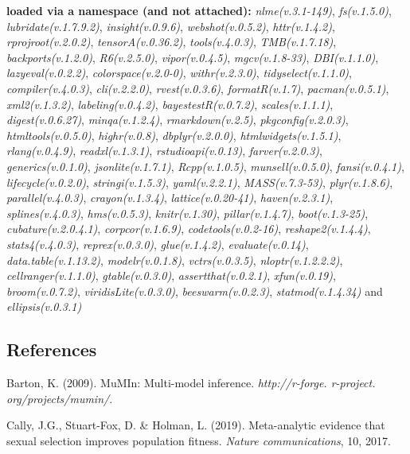 \documentclass[
]{article}
\begin{document}
\textbf{loaded via a namespace (and not attached):}
\emph{nlme(v.3.1-149)}, \emph{fs(v.1.5.0)}, \emph{lubridate(v.1.7.9.2)},
\emph{insight(v.0.9.6)}, \emph{webshot(v.0.5.2)}, \emph{httr(v.1.4.2)},
\emph{rprojroot(v.2.0.2)}, \emph{tensorA(v.0.36.2)},
\emph{tools(v.4.0.3)}, \emph{TMB(v.1.7.18)}, \emph{backports(v.1.2.0)},
\emph{R6(v.2.5.0)}, \emph{vipor(v.0.4.5)}, \emph{mgcv(v.1.8-33)},
\emph{DBI(v.1.1.0)}, \emph{lazyeval(v.0.2.2)},
\emph{colorspace(v.2.0-0)}, \emph{withr(v.2.3.0)},
\emph{tidyselect(v.1.1.0)}, \emph{compiler(v.4.0.3)},
\emph{cli(v.2.2.0)}, \emph{rvest(v.0.3.6)}, \emph{formatR(v.1.7)},
\emph{pacman(v.0.5.1)}, \emph{xml2(v.1.3.2)}, \emph{labeling(v.0.4.2)},
\emph{bayestestR(v.0.7.2)}, \emph{scales(v.1.1.1)},
\emph{digest(v.0.6.27)}, \emph{minqa(v.1.2.4)}, \emph{rmarkdown(v.2.5)},
\emph{pkgconfig(v.2.0.3)}, \emph{htmltools(v.0.5.0)},
\emph{highr(v.0.8)}, \emph{dbplyr(v.2.0.0)},
\emph{htmlwidgets(v.1.5.1)}, \emph{rlang(v.0.4.9)},
\emph{readxl(v.1.3.1)}, \emph{rstudioapi(v.0.13)},
\emph{farver(v.2.0.3)}, \emph{generics(v.0.1.0)},
\emph{jsonlite(v.1.7.1)}, \emph{Rcpp(v.1.0.5)}, \emph{munsell(v.0.5.0)},
\emph{fansi(v.0.4.1)}, \emph{lifecycle(v.0.2.0)},
\emph{stringi(v.1.5.3)}, \emph{yaml(v.2.2.1)}, \emph{MASS(v.7.3-53)},
\emph{plyr(v.1.8.6)}, \emph{parallel(v.4.0.3)}, \emph{crayon(v.1.3.4)},
\emph{lattice(v.0.20-41)}, \emph{haven(v.2.3.1)},
\emph{splines(v.4.0.3)}, \emph{hms(v.0.5.3)}, \emph{knitr(v.1.30)},
\emph{pillar(v.1.4.7)}, \emph{boot(v.1.3-25)},
\emph{cubature(v.2.0.4.1)}, \emph{corpcor(v.1.6.9)},
\emph{codetools(v.0.2-16)}, \emph{reshape2(v.1.4.4)},
\emph{stats4(v.4.0.3)}, \emph{reprex(v.0.3.0)}, \emph{glue(v.1.4.2)},
\emph{evaluate(v.0.14)}, \emph{data.table(v.1.13.2)},
\emph{modelr(v.0.1.8)}, \emph{vctrs(v.0.3.5)}, \emph{nloptr(v.1.2.2.2)},
\emph{cellranger(v.1.1.0)}, \emph{gtable(v.0.3.0)},
\emph{assertthat(v.0.2.1)}, \emph{xfun(v.0.19)}, \emph{broom(v.0.7.2)},
\emph{viridisLite(v.0.3.0)}, \emph{beeswarm(v.0.2.3)},
\emph{statmod(v.1.4.34)} and \emph{ellipsis(v.0.3.1)}

\hypertarget{references}{%
\subsection*{References}\label{references}}

\hypertarget{refs}{}
\leavevmode\hypertarget{ref-barton2009mumin}{}%
Barton, K. (2009). MuMIn: Multi-model inference. \emph{http://r-forge.
r-project. org/projects/mumin/}.

\leavevmode\hypertarget{ref-cally2019meta}{}%
Cally, J.G., Stuart-Fox, D. \& Holman, L. (2019). Meta-analytic evidence
that sexual selection improves population fitness. \emph{Nature
communications}, 10, 2017.
\end{document}

